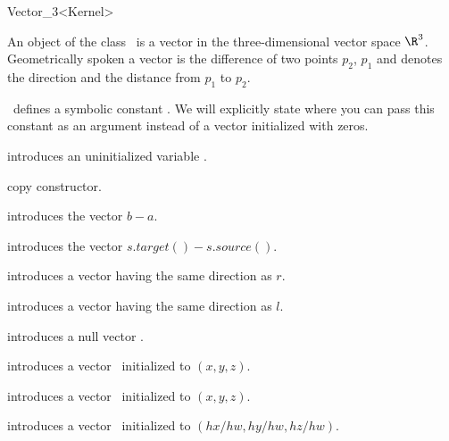 \begin{ccRefClass} {Vector_3<Kernel>}

\ccDefinition

An object of the class \ccRefName\ is a vector in the three-dimensional 
vector space $\R^3$. Geometrically spoken a vector is the difference
of two points $p_2$, $p_1$ and denotes the direction and the distance
from   $p_1$ to $p_2$. 

\cgal\ defines a symbolic constant . We 
will explicitly state where you can pass this constant as an argument
instead of a vector initialized with zeros.

\ccTypes
{}
\ccThreeToTwo


\ccCreation
{}


\ccHidden{}
             {introduces an uninitialized variable \ccVar.}

\ccHidden {}
            {copy constructor.}

            {introduces the vector $b-a$.}

            {introduces the vector $s.target()-s.source()$.}

            {introduces a vector having the same direction as $r$.}

            {introduces a vector having the same direction as $l$.}

            {introduces a null vector \ccVar.}

            {introduces a vector \ccVar\ initialized to $(x, y, z)$.}

            {introduces a vector \ccVar\ initialized to $(x, y, z)$.}

            {introduces a vector \ccVar\ initialized to $(hx/hw, hy/hw, hz/hw)$.}


\end{ccRefClass}
